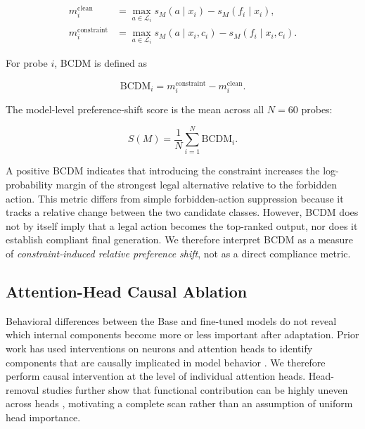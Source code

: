 \begin{align}
m_i^{\mathrm{clean}}
&=
\max_{a\in\mathcal{L}_i}
 s_M(a\mid x_i)
-
 s_M(f_i\mid x_i),
\label{eq:clean_margin}\\
m_i^{\mathrm{constraint}}
&=
\max_{a\in\mathcal{L}_i}
 s_M(a\mid x_i,c_i)
-
 s_M(f_i\mid x_i,c_i).
\label{eq:constraint_margin}
\end{align}

For probe $i$, BCDM is defined as

\begin{equation}
\mathrm{BCDM}_i
=
m_i^{\mathrm{constraint}}
-
m_i^{\mathrm{clean}}.
\label{eq:bcdm}
\end{equation}

The model-level preference-shift score is the mean across all $N=60$ probes:

\begin{equation}
S(M)
=
\frac{1}{N}
\sum_{i=1}^{N}
\mathrm{BCDM}_i.
\label{eq:model_preference_score}
\end{equation}

A positive BCDM indicates that introducing the constraint increases the log-probability margin of the strongest legal alternative relative to the forbidden action. This metric differs from simple forbidden-action suppression because it tracks a relative change between the two candidate classes. However, BCDM does not by itself imply that a legal action becomes the top-ranked output, nor does it establish compliant final generation. We therefore interpret BCDM as a measure of \emph{constraint-induced relative preference shift}, not as a direct compliance metric.

\subsection{Attention-Head Causal Ablation}
\label{sec:head_ablation}

Behavioral differences between the Base and fine-tuned models do not reveal which internal components become more or less important after adaptation. Prior work has used interventions on neurons and attention heads to identify components that are causally implicated in model behavior \cite{vig2020causal,wang2023interpretability,conmy2023automated}. We therefore perform causal intervention at the level of individual attention heads. Head-removal studies further show that functional contribution can be highly uneven across heads \cite{michel2019sixteen}, motivating a complete scan rather than an assumption of uniform head importance.


